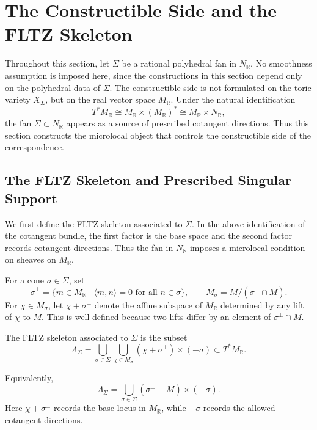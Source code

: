 \section{The Constructible Side and the FLTZ Skeleton}

Throughout this section, let \(\Sigma\) be a rational polyhedral fan in
\(N_{\mathbb R}\). No smoothness assumption is imposed here, since the
constructions in this section depend only on the polyhedral data of
\(\Sigma\). The constructible side is not formulated on the toric variety
\(X_\Sigma\), but on the real vector space \(M_{\mathbb R}\). Under the natural
identification
\[
T^*M_{\mathbb R}
\cong
M_{\mathbb R}\times (M_{\mathbb R})^*
\cong
M_{\mathbb R}\times N_{\mathbb R},
\]
the fan \(\Sigma\subset N_{\mathbb R}\) appears as a source of prescribed
cotangent directions. Thus this section constructs the microlocal object that
controls the constructible side of the correspondence.

\subsection{The FLTZ Skeleton and Prescribed Singular Support}

We first define the FLTZ skeleton associated to \(\Sigma\). In the above
identification of the cotangent bundle, the first factor is the base space and
the second factor records cotangent directions. Thus the fan in
\(N_{\mathbb R}\) imposes a microlocal condition on sheaves on
\(M_{\mathbb R}\).

\begin{definition}
For a cone \(\sigma\in\Sigma\), set
\[
\sigma^\perp
=
\{m\in M_{\mathbb R}\mid \langle m,n\rangle=0
\text{ for all }n\in\sigma\},
\qquad
M_\sigma=M/(\sigma^\perp\cap M).
\]
For \(\chi\in M_\sigma\), let \(\chi+\sigma^\perp\) denote the affine subspace
of \(M_{\mathbb R}\) determined by any lift of \(\chi\) to \(M\). This is
well-defined because two lifts differ by an element of \(\sigma^\perp\cap M\).

The FLTZ skeleton associated to \(\Sigma\) is the subset
\[
\Lambda_\Sigma
=
\bigcup_{\sigma\in\Sigma}
\bigcup_{\chi\in M_\sigma}
(\chi+\sigma^\perp)\times(-\sigma)
\subset T^*M_{\mathbb R}.
\]
\end{definition}

Equivalently,
\[
\Lambda_\Sigma
=
\bigcup_{\sigma\in\Sigma}
(\sigma^\perp+M)\times(-\sigma).
\]
Here \(\chi+\sigma^\perp\) records the base locus in \(M_{\mathbb R}\), while
\(-\sigma\) records the allowed cotangent directions.

